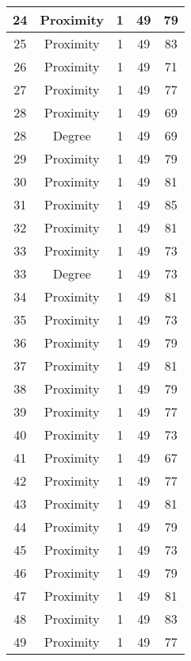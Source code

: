 \documentclass[results.tex]{subfiles}
\begin{document}
\begin{center}
\begin{tabular}{| c || c | c | c | c |}
    \hline
    24 & Proximity & 1 & 49 & 79 \\ 
    \hline
    25 & Proximity & 1 & 49 & 83 \\ 
    \hline
    26 & Proximity & 1 & 49 & 71 \\ 
    \hline
    27 & Proximity & 1 & 49 & 77 \\ 
    \hline
    28 & Proximity & 1 & 49 & 69 \\ 
    \hline
    28 & Degree & 1 & 49 & 69 \\ 
    \hline
    29 & Proximity & 1 & 49 & 79 \\ 
    \hline
    30 & Proximity & 1 & 49 & 81 \\ 
    \hline
    31 & Proximity & 1 & 49 & 85 \\ 
    \hline
    32 & Proximity & 1 & 49 & 81 \\ 
    \hline
    33 & Proximity & 1 & 49 & 73 \\ 
    \hline
    33 & Degree & 1 & 49 & 73 \\ 
    \hline
    34 & Proximity & 1 & 49 & 81 \\ 
    \hline
    35 & Proximity & 1 & 49 & 73 \\ 
    \hline
    36 & Proximity & 1 & 49 & 79 \\ 
    \hline
    37 & Proximity & 1 & 49 & 81 \\ 
    \hline
    38 & Proximity & 1 & 49 & 79 \\ 
    \hline
    39 & Proximity & 1 & 49 & 77 \\ 
    \hline
    40 & Proximity & 1 & 49 & 73 \\ 
    \hline
    41 & Proximity & 1 & 49 & 67 \\ 
    \hline
    42 & Proximity & 1 & 49 & 77 \\ 
    \hline
    43 & Proximity & 1 & 49 & 81 \\ 
    \hline
    44 & Proximity & 1 & 49 & 79 \\ 
    \hline
    45 & Proximity & 1 & 49 & 73 \\ 
    \hline
    46 & Proximity & 1 & 49 & 79 \\ 
    \hline
    47 & Proximity & 1 & 49 & 81 \\ 
    \hline
    48 & Proximity & 1 & 49 & 83 \\ 
    \hline
    49 & Proximity & 1 & 49 & 77 \\ 
    \hline   \end{tabular}
\end{center}
\end{document}
